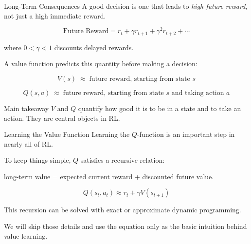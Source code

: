 \begin{frame}{Long-Term Consequences}
  A good decision is one that leads to \emph{high future reward}, not just a high immediate reward.

  \vspace{0.05em}
  \[
    \text{Future Reward}
    =
    r_t
    +\gamma r_{t+1}
    +\gamma^2 r_{t+2}
    +\cdots
  \]

  \vspace{-0.2em}
  where $0 < \gamma < 1$ discounts delayed rewards.

  \vspace{0.1em}
  A value function predicts this quantity before making a decision:

  \vspace{-0.4em}
  \[
  V(s)
  \;\approx\;
  \text{future reward, starting from state $s$}
  \]

  \vspace{-0.7em}
  \[
  Q(s,a)
  \;\approx\;
  \text{future reward, starting from state $s$ and taking action $a$}
  \]

  \vspace{-0.35em}
  \begin{block}{Main takeaway}
    $V$ and $Q$ quantify how good it is to be in a state and to take an action. They are central objects in RL.
  \end{block}
\end{frame}

\begin{frame}{Learning the Value Function}
  Learning the $Q$-function is an important step in nearly all of RL.

  \vspace{0.25cm}
  To keep things simple, $Q$ satisfies a recursive relation:

  \vspace{0.1cm}
  long-term value =
  expected current reward +
  discounted future value.

  \vspace{0.15cm}
  \[
    Q(s_t,a_t) \approx r_t + \gamma V(s_{t+1})
  \]

  \vspace{0.2cm}
  This recursion can be solved with exact or approximate dynamic programming.

  \vspace{0.2cm}
  We will skip those details and use the equation only as the basic intuition behind value learning.
\end{frame}

